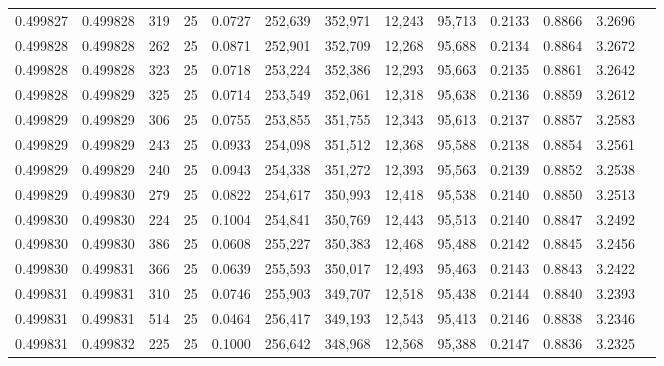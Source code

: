 \begin{tabular}{rrrrrrrrrrrrr}
0.499827 & 0.499828 &   319 &  25 &                                     0.0727 & 252,639 & 352,971 &  12,243 &  95,713 & 0.2133 & 0.8866 & 3.2696 \\
0.499828 & 0.499828 &   262 &  25 &                                     0.0871 & 252,901 & 352,709 &  12,268 &  95,688 & 0.2134 & 0.8864 & 3.2672 \\
0.499828 & 0.499828 &   323 &  25 &                                     0.0718 & 253,224 & 352,386 &  12,293 &  95,663 & 0.2135 & 0.8861 & 3.2642 \\
0.499828 & 0.499829 &   325 &  25 &                                     0.0714 & 253,549 & 352,061 &  12,318 &  95,638 & 0.2136 & 0.8859 & 3.2612 \\
0.499829 & 0.499829 &   306 &  25 &                                     0.0755 & 253,855 & 351,755 &  12,343 &  95,613 & 0.2137 & 0.8857 & 3.2583 \\
0.499829 & 0.499829 &   243 &  25 &                                     0.0933 & 254,098 & 351,512 &  12,368 &  95,588 & 0.2138 & 0.8854 & 3.2561 \\
0.499829 & 0.499829 &   240 &  25 &                                     0.0943 & 254,338 & 351,272 &  12,393 &  95,563 & 0.2139 & 0.8852 & 3.2538 \\
0.499829 & 0.499830 &   279 &  25 &                                     0.0822 & 254,617 & 350,993 &  12,418 &  95,538 & 0.2140 & 0.8850 & 3.2513 \\
0.499830 & 0.499830 &   224 &  25 &                                     0.1004 & 254,841 & 350,769 &  12,443 &  95,513 & 0.2140 & 0.8847 & 3.2492 \\
0.499830 & 0.499830 &   386 &  25 &                                     0.0608 & 255,227 & 350,383 &  12,468 &  95,488 & 0.2142 & 0.8845 & 3.2456 \\
0.499830 & 0.499831 &   366 &  25 &                                     0.0639 & 255,593 & 350,017 &  12,493 &  95,463 & 0.2143 & 0.8843 & 3.2422 \\
0.499831 & 0.499831 &   310 &  25 &                                     0.0746 & 255,903 & 349,707 &  12,518 &  95,438 & 0.2144 & 0.8840 & 3.2393 \\
0.499831 & 0.499831 &   514 &  25 &                                     0.0464 & 256,417 & 349,193 &  12,543 &  95,413 & 0.2146 & 0.8838 & 3.2346 \\
0.499831 & 0.499832 &   225 &  25 &                                     0.1000 & 256,642 & 348,968 &  12,568 &  95,388 & 0.2147 & 0.8836 & 3.2325 \\

\end{tabular}
